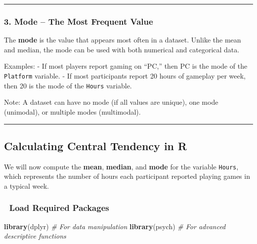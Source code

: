 \documentclass[
]{book}
\newenvironment{Shaded}{\begin{snugshade}}{\end{snugshade}}
\newcommand{\CommentTok}[1]{\textcolor[rgb]{0.56,0.35,0.01}{\textit{#1}}}
\newcommand{\FunctionTok}[1]{\textcolor[rgb]{0.13,0.29,0.53}{\textbf{#1}}}
\newcommand{\NormalTok}[1]{#1}
\begin{document}
\begin{center}\rule{0.5\linewidth}{0.5pt}\end{center}

\subsubsection*{\texorpdfstring{3. \textbf{Mode} -- The Most Frequent Value}{3. Mode -- The Most Frequent Value}}\label{mode-the-most-frequent-value}

The \textbf{mode} is the value that appears most often in a dataset. Unlike the mean and median, the mode can be used with both numerical and categorical data.

Examples: - If most players report gaming on ``PC,'' then PC is the mode of the \texttt{Platform} variable. - If most participants report 20 hours of gameplay per week, then 20 is the mode of the \texttt{Hours} variable.

Note: A dataset can have no mode (if all values are unique), one mode (unimodal), or multiple modes (multimodal).

\begin{center}\rule{0.5\linewidth}{0.5pt}\end{center}

\subsection*{Calculating Central Tendency in R}\label{calculating-central-tendency-in-r}

We will now compute the \textbf{mean}, \textbf{median}, and \textbf{mode} for the variable \texttt{Hours}, which represents the number of hours each participant reported playing games in a typical week.

\subsubsection*{🧮 Load Required Packages}\label{load-required-packages}

\begin{Shaded}
\begin{Highlighting}[]
\FunctionTok{library}\NormalTok{(dplyr)   }\CommentTok{\# For data manipulation}
\FunctionTok{library}\NormalTok{(psych)   }\CommentTok{\# For advanced descriptive functions}
\end{Highlighting}
\end{Shaded}
\end{document}
